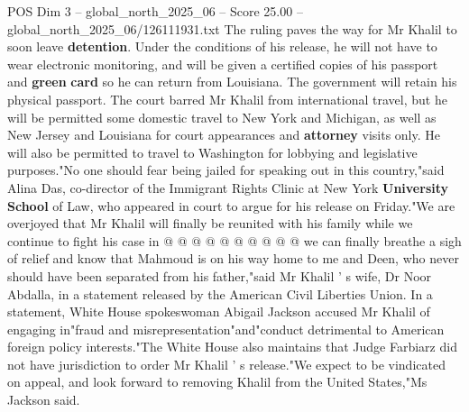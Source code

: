\begin{textsample}{POS Dim 3 – global\_north\_2025\_06 – Score 25.00 – global\_north\_2025\_06/126111931.txt}
The ruling paves the way for Mr Khalil to soon leave \textbf{detention}.
Under the conditions of his release, he will not have to wear electronic monitoring, and will be given a certified copies of his passport and \textbf{green} \textbf{card} so he can return from Louisiana.
The government will retain his physical passport.
The court barred Mr Khalil from international travel, but he will be permitted some domestic travel to New York and Michigan, as well as New Jersey and Louisiana for court appearances and \textbf{attorney} visits only.
He will also be permitted to travel to Washington for lobbying and legislative purposes."No one should fear being jailed for speaking out in this country,"said Alina Das, co-director of the Immigrant Rights Clinic at New York \textbf{University} \textbf{School} of Law, who appeared in court to argue for his release on Friday."We are overjoyed that Mr Khalil will finally be reunited with his family while we continue to fight his case in @ @ @ @ @ @ @ @ @ @ we can finally breathe a sigh of relief and know that Mahmoud is on his way home to me and Deen, who never should have been separated from his father,"said Mr Khalil ' s wife, Dr Noor Abdalla, in a statement released by the American Civil Liberties Union.
In a statement, White House spokeswoman Abigail Jackson accused Mr Khalil of engaging in"fraud and misrepresentation"and"conduct detrimental to American foreign policy interests."The White House also maintains that Judge Farbiarz did not have jurisdiction to order Mr Khalil ' s release."We expect to be vindicated on appeal, and look forward to removing Khalil from the United States,"Ms Jackson said.

\end{textsample}
